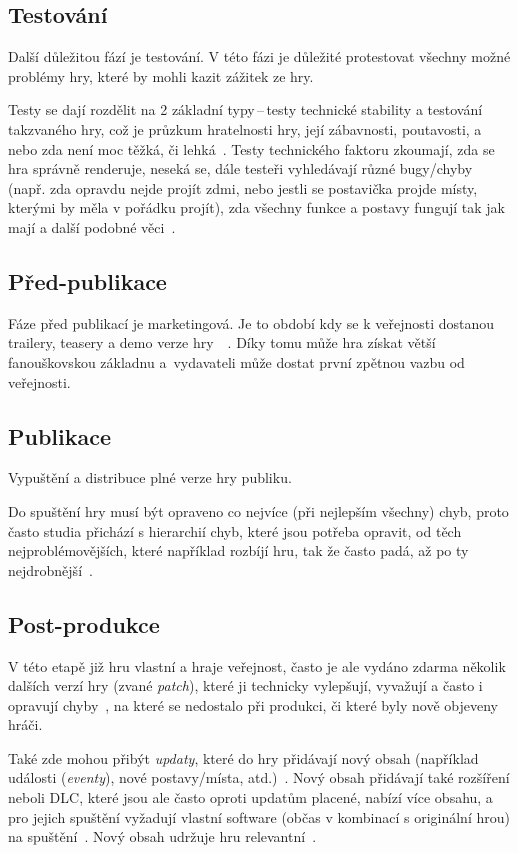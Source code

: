\subsection*{Testování}
Další důležitou fází je testování. V této fázi je důležité protestovat všechny možné problémy hry, které by mohli kazit zážitek ze hry.

Testy se dají rozdělit na 2 základní typy\,--\,testy technické stability a testování takzvaného  hry, což je průzkum hratelnosti hry, její zábavnosti, poutavosti, a nebo zda není moc těžká, či lehká~\cite{GameMaker_development}. Testy technického faktoru zkoumají, zda se hra správně renderuje, neseká se, dále testeři vyhledávají různé bugy/chyby (např. zda opravdu nejde projít zdmi, nebo jestli se postavička projde místy, kterými by měla v pořádku projít), zda všechny funkce a postavy fungují tak jak mají a další podobné věci~\cite{g2_game_development}.

\subsection*{Před-publikace}
Fáze před publikací je marketingová. Je to období kdy se k veřejnosti dostanou trailery, teasery a demo verze hry~~\cite{GameMaker_development}. Díky tomu může hra získat větší fanouškovskou základnu a~vydavateli může dostat první zpětnou vazbu od veřejnosti.

\subsection*{Publikace}
Vypuštění a distribuce plné verze hry publiku.

Do spuštění hry musí být opraveno co nejvíce (při nejlepším všechny) chyb, proto často studia přichází s hierarchií chyb, které jsou potřeba opravit, od těch nejproblémovějších, které například rozbíjí hru, tak že často padá, až po ty nejdrobnější~\cite{g2_game_development}.

\subsection*{Post-produkce}
V této etapě již hru vlastní a hraje veřejnost, často je ale vydáno zdarma několik dalších verzí hry (zvané \textit{patch}), které ji technicky vylepšují, vyvažují a často i opravují chyby~\cite{novak2011game}, na které se nedostalo při produkci, či které byly nově objeveny hráči. 

Také zde mohou přibýt \textit{updaty}, které do hry přidávají nový obsah (například události (\textit{eventy}), nové postavy/místa, atd.)~\cite{g2_game_development}. Nový obsah přidávají také rozšíření neboli DLC, které jsou ale často oproti updatům placené, nabízí více obsahu, a pro jejich spuštění vyžadují vlastní software (občas v kombinací s originální hrou) na spuštění~\cite{novak2011game}. Nový obsah udržuje hru relevantní~\cite{GameMaker_development}.

